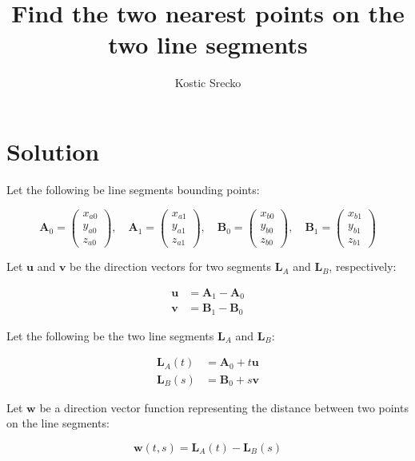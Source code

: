 \documentclass{article}
\title{Find the two nearest points on the two line segments}
\author{Kostic Srecko}
\begin{document}
\maketitle

\section*{Solution}

Let the following be line segments bounding points:

\[
\mathbf{A}_0 = \begin{pmatrix} x_{a0} \\ y_{a0} \\ z_{a0} \end{pmatrix}, \quad
\mathbf{A}_1 = \begin{pmatrix} x_{a1} \\ y_{a1} \\ z_{a1} \end{pmatrix}, \quad
\mathbf{B}_0 = \begin{pmatrix} x_{b0} \\ y_{b0} \\ z_{b0} \end{pmatrix}, \quad
\mathbf{B}_1 = \begin{pmatrix} x_{b1} \\ y_{b1} \\ z_{b1} \end{pmatrix}
\]

Let $\mathbf{u}$ and $\mathbf{v}$ be the direction vectors for two segments $\mathbf{L}_A$ and $\mathbf{L}_B$, respectively:

\begin{align*}
    \mathbf{u} &= \mathbf{A}_1 - \mathbf{A}_0 \\
    \mathbf{v} &= \mathbf{B}_1 - \mathbf{B}_0
\end{align*}

Let the following be the two line segments $\mathbf{L}_A$ and $\mathbf{L}_B$:

\begin{align*}
    \mathbf{L}_A(t) &= \mathbf{A}_0 + t\mathbf{u} \\
    \mathbf{L}_B(s) &= \mathbf{B}_0 + s\mathbf{v}
\end{align*}

Let $\mathbf{w}$ be a direction vector function representing the distance between two points on the line segments:

\[
\mathbf{w}(t, s) = \mathbf{L}_A(t) - \mathbf{L}_B(s)
\]
\end{document}
